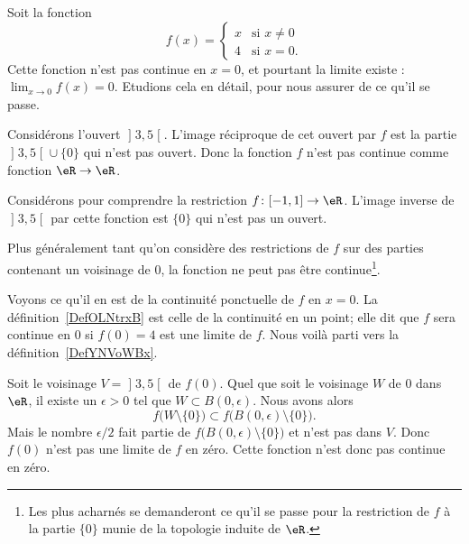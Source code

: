 \begin{example}     \label{EXooKREUooLeuIlv}
	Soit la fonction
	\begin{equation}        \label{EQooSYSWooSGsUfR}
		f(x)=\begin{cases}
			x & \text{si } x\neq 0 \\
			4 & \text{si } x=0.
		\end{cases}
	\end{equation}
	Cette fonction n'est pas continue en \( x=0\), et pourtant la limite existe : \( \lim_{x\to 0} f(x)=0\). Etudions cela en détail, pour nous assurer de ce qu'il se passe.

	Considérons l'ouvert \( \mathopen] 3 , 5 \mathclose[\). L'image réciproque de cet ouvert par \( f\) est la partie \( \mathopen] 3 , 5 \mathclose[\cup\{ 0 \}\) qui n'est pas ouvert. Donc la fonction \( f\) n'est pas continue comme fonction \( \eR\to \eR\).

		Considérons pour comprendre la restriction \( f\colon \mathopen[ -1 , 1 \mathclose]\to \eR\). L'image inverse de \( \mathopen] 3 , 5 \mathclose[\) par cette fonction est \( \{ 0 \}\) qui n'est pas un ouvert.

		Plus généralement tant qu'on considère des restrictions de \( f\) sur des parties contenant un voisinage de \( 0\), la fonction ne peut pas être continue\footnote{Les plus acharnés se demanderont ce qu'il se passe pour la restriction de \( f\) à la partie \( \{ 0 \}\) munie de la topologie induite de \( \eR\).}.

		Voyons ce qu'il en est de la continuité ponctuelle de \( f\) en \( x=0\). La définition~\ref{DefOLNtrxB} est celle de la continuité en un point; elle dit que \( f\) sera continue en \( 0\) si \( f(0)=4\) est une limite de \( f\). Nous voilà parti vers la définition~\ref{DefYNVoWBx}.

		Soit le voisinage \( V=\mathopen] 3 , 5 \mathclose[\) de \( f(0)\). Quel que soit le voisinage \( W\) de \( 0\) dans \( \eR\), il existe un \( \epsilon>0\) tel que \( W\subset B(0,\epsilon)\). Nous avons alors
	\begin{equation}
		f\big( W\setminus \{ 0 \} \big)\subset f\big( B(0,\epsilon)\setminus\{ 0 \} \big).
	\end{equation}
	Mais le nombre \( \epsilon/2\) fait partie de \( f\big( B(0,\epsilon)\setminus\{ 0 \} \big)\) et n'est pas dans \( V\). Donc \( f(0)\) n'est pas une limite de \( f\) en zéro. Cette fonction n'est donc pas continue en zéro.
\end{example}

